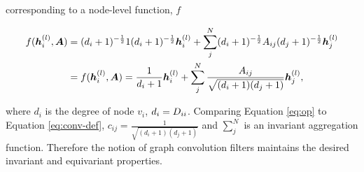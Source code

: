 corresponding to a node-level function, $f$

\begin{equation}
    \begin{aligned}
        \label{eq:op}
        f({\bm{h}}_i^{(l)}, {\bm{A}}) &= (d_i + 1)^{-\frac12}1(d_i + 1)^{-\frac12}{\bm{h}}_i^{(l)} + \sum_j^N(d_i + 1)^{-\frac12}{A}_{ij}(d_j + 1)^{-\frac12}{\bm{h}}_j^{(l)} \\
        &= f({\bm{h}}_i^{(l)}, {\bm{A}}) = \frac1{d_i + 1}{\bm{h}}_i^{(l)} + \sum_j^N\frac{{A}_{ij}}{\sqrt{(d_i + 1)(d_j + 1)}}{\bm{h}}_j^{(l)},
    \end{aligned}
\end{equation}

where $d_i$ is the degree of node $v_i$, $d_i = {D}_{ii}$.
Comparing Equation \ref{eq:op} to Equation \ref{eq:conv-def}, $c_{ij} = \frac1{\sqrt{(d_i + 1)(d_j + 1)}}$ and $\sum_j^N$ is an invariant aggregation function.
Therefore the notion of graph convolution filters maintains the desired invariant and equivariant properties.









